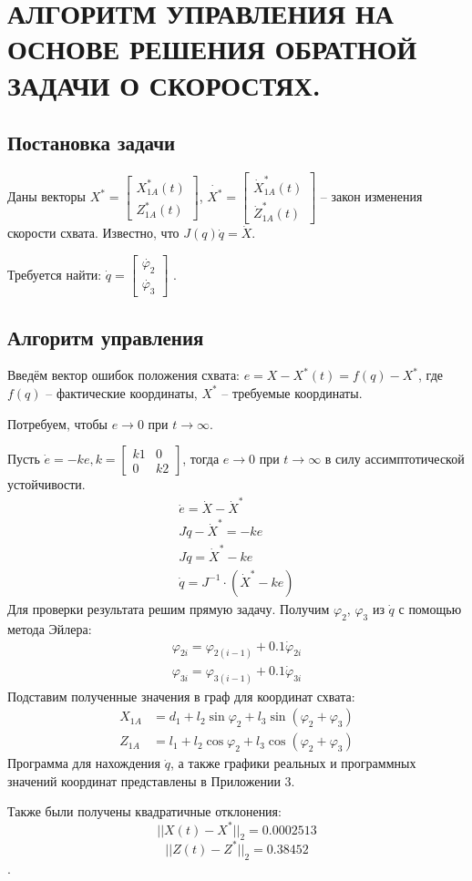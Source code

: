 \chapter{\MakeUppercase{Алгоритм управления на основе решения обратной задачи о скоростях.}}
\section{Постановка задачи}
Даны векторы $ X^* = \begin{bmatrix}
    X_{1A}^*(t) \\ Z_{1A}^*(t)
\end{bmatrix} $, $ \dot{X^*} = \begin{bmatrix}
    \dot{X}_{1A}^*(t) \\ \dot{Z}_{1A}^*(t)
\end{bmatrix} $ -- закон изменения скорости схвата.
Известно, что $ J(q)\dot{q} = \dot{X}$.

Требуется найти: $ \dot{q} = \begin{bmatrix}
    \dot{\varphi_2} \\ \dot{\varphi_3}
\end{bmatrix} $ .

\section{Алгоритм управления}

Введём вектор ошибок положения схвата: $e=X-X^*(t)=f(q)-X^*$, где $f(q)$ -- фактические координаты, $X^*$ -- требуемые координаты.

Потребуем, чтобы $e\rightarrow0$ при $t\rightarrow\infty$.

Пусть $\dot{e}=-ke,k= \begin{bmatrix}
    k1 & 0 \\ 0 & k2
\end{bmatrix} $, тогда $e\rightarrow0$ при $t\rightarrow\infty$ в силу ассимптотической устойчивости.
\begin{align*}
    \dot{e} = \dot{X}-\dot{X}^* \\
    J\dot{q}-\dot{X}^* = -ke \\
    J\dot{q} = \dot{X}^*-ke \\
    \dot{q} =J^{-1}\cdot(\dot{X}^*-ke)
\end{align*}
Для проверки результата решим прямую задачу. Получим $\varphi_2$, $\varphi_3$ из $\dot{q}$ с помощью метода Эйлера:
\begin{align*}
    \varphi_{2i} = \varphi_{2(i-1)}+0.1\dot{\varphi}_{2i} \\
    \varphi_{3i} = \varphi_{3(i-1)}+0.1\dot{\varphi}_{3i}
\end{align*}
Подставим полученные значения в граф для координат схвата:
\begin{align*}
    X_{1A}&=d_1+l_2\sin\varphi_2+l_3\sin{(\varphi_2+\varphi_3)} \\
    Z_{1A}&=l_1+l_2\cos\varphi_2+l_3\cos{(\varphi_2+\varphi_3)}
\end{align*}
Программа для нахождения $\dot{q}$, а также графики реальных и программных значений координат представлены в Приложении 3.

Также были получены квадратичные отклонения: 
$$||X(t)-X^*||_2=0.0002513$$
$$||Z(t)-Z^*||_2=0.38452$$.
